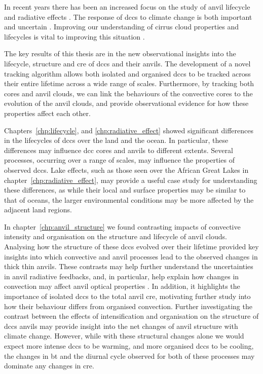 In recent years there has been an increased focus on the study of anvil lifecycle \citep{wall_life_2018, sokol_tropical_2020} and radiative effects \citep{bouniol_life_2021}.
The response of \acrshort{dcc}s to climate change is both important and uncertain \citep{sherwood_assessment_2020, hill_climate_2023}.
Improving our understanding of cirrus cloud properties and lifecycles is vital to improving this situation \citep{sullivan_ice_2021, gasparini_opinion_2023}.

The key results of this thesis are in the new observational insights into the lifecycle, structure and \acrshort{cre} of \acrshort{dcc}s and their anvils.
The development of a novel tracking algorithm allows both isolated and organised \acrshort{dcc}s to be tracked across their entire lifetime across a wide range of scales.
Furthermore, by tracking both cores and anvil clouds, we can link the behaviours of the convective cores to the evolution of the anvil clouds, and provide observational evidence for how these properties affect each other.

Chapters~\ref{chp:lifecycle}, and \ref{chp:radiative_effect} showed significant differences in the lifecycles of \acrshort{dcc}s over the land and the ocean.
In particular, these differences may influence \acrshort{dcc} cores and anvils to different extents.
Several processes, occurring over a range of scales, may influence the properties of observed \acrshort{dcc}s.
Lake effects, such as those seen over the African Great Lakes in chapter~\ref{chp:radiative_effect}, may provide a useful case study for understanding these differences, as while their local and surface properties may be similar to that of oceans, the larger environmental conditions may be more affected by the adjacent land regions.

In chapter~\ref{chp:anvil_structure} we found contrasting impacts of convective intensity and organisation on the structure and lifecycle of anvil clouds. 
Analysing how the structure of these \acrshort{dcc}s evolved over their lifetime provided key insights into which convective and anvil processes lead to the observed changes in thick thin anvils.
These contrasts may help further understand the uncertainties in anvil radiative feedbacks, and, in particular, help explain how changes in convection may affect anvil optical properties \citep{mckim_weak_2024}.
In addition, it highlights the importance of isolated \acrshort{dcc}s to the total anvil \acrshort{cre}, motivating further study into how their behaviour differs from organised convection.
Further investigating the contrast between the effects of intensification and organisation on the structure of \acrshort{dcc}s anvils may provide insight into the net changes of anvil structure with climate change. However, while with these structural changes alone we would expect more intense \acrshort{dcc}s to be warming, and more organised \acrshort{dcc}s to be cooling, the changes in \acrshort{bt} and the diurnal cycle observed for both of these processes may dominate any changes in \acrshort{cre}.

